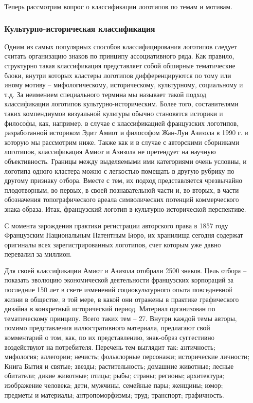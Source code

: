 Теперь рассмотрим вопрос о классификации логотипов по темам и мотивам.

\subsubsection{Культурно-историческая классификация}
\label{2.3}

Одним из самых популярных способов классифицирования логотипов следует считать
организацию знаков по принципу ассоциативного ряда. Как правило, структурно
такая классификация представляет собой обширные тематические блоки,
внутри которых кластеры логотипов дифференцируются по тому или иному мотиву --
мифологическому, историческому, культурному, социальному и т.д. За неимением
специального термина мы называет такой подход классификации логотипов
культурно-историческим. Более того, составителями таких компендиумов визуальной
культуры обычно становятся историки и философы, как, например, в случае с
классификацией французских логотипов, разработанной историком Эдит Амиот и
философом Жан-Луи Азизола в 1990 г. и которую мы рассмотрим ниже. Также как
и в случае с авторскими сборниками логотипов, классификация Амиот и Азизола
не претендует на научную объективность. Границы между выделяемыми ими категориями
очень условны, и логотипа одного кластера можно с легкостью помещать в
другую рубрику по другому признаку отбора. Вместе с тем, их подход представляется
чрезвычайно плодотворным, во-первых, в своей познавательной части и, во-вторых,
в части обозначения топографического ареала символических потенций коммерческого
знака-образа. Итак, французский логотип в культурно-исторической перспективе.

С момента зарождения практики регистрации авторского права в 1857 году
Французским Национальным Патентным Бюро, их хранилища сегодня содержат
оригиналы всех зарегистрированных логотипов, счет которым уже давно перевалил
за миллион.

Для своей классификации Амиот и Азизола отобрали 2500
знаков. \autocite{edithjeanluois} Цель отбора --
показать эволюцию экономической деятельности французских корпораций за последние
150 лет в свете изменений социокультурного опыта повседневной жизни в обществе,
в той мере, в какой они отражены в практике графического дизайна в конкретный
исторический период. Материал организован по тематическому принципу. Всего таких
тем -- 27. Внутри каждой темы авторы, помимо представления иллюстративного
материала, предлагают свой комментарий о том, как, по их представлению,
знак-образ суггестивно воздействуют на потребителя. Перечень тем выглядит так:
античность; мифология; аллегории; нечисть; фольклорные персонажи; исторические
личности; Книга Бытия и святые; звезды; растительность; домашние животные;
лесные обитатели; дикие животные; птицы; рыбы; страны; регионы; архитектура;
изображение человека; дети, мужчины, семейные пары; женщины; юмор; предметы и
материалы; антропоморфизмы; труд; транспорт; графичность.


